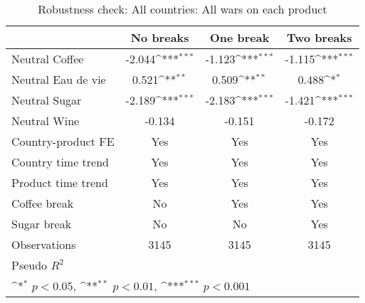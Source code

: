 \begin{table}[htbp]\centering
\def\sym#1{\ifmmode^{#1}\else\(^{#1}\)\fi}
\caption{Robustness check: All countries: All wars on each product\label{tab1}}
\begin{tabular}{l*{3}{c}}
\hline\hline
                    &\multicolumn{1}{c}{No breaks}&\multicolumn{1}{c}{One break}&\multicolumn{1}{c}{Two breaks}\\
\hline
Neutral Coffee      &      -2.044\sym{***}&      -1.123\sym{***}&      -1.115\sym{***}\\
Neutral Eau de vie  &       0.521\sym{**} &       0.509\sym{**} &       0.488\sym{*}  \\
Neutral Sugar       &      -2.189\sym{***}&      -2.183\sym{***}&      -1.421\sym{***}\\
Neutral Wine        &      -0.134         &      -0.151         &      -0.172         \\
Country-product FE  &         Yes         &         Yes         &         Yes         \\
Country time trend  &         Yes         &         Yes         &         Yes         \\
Product time trend  &         Yes         &         Yes         &         Yes         \\
Coffee break        &          No         &         Yes         &         Yes         \\
Sugar break         &          No         &          No         &         Yes         \\
\hline
Observations        &        3145         &        3145         &        3145         \\
Pseudo \(R^{2}\)    &                     &                     &                     \\
\hline\hline
\multicolumn{4}{l}{\footnotesize \sym{*} \(p<0.05\), \sym{**} \(p<0.01\), \sym{***} \(p<0.001\)}\\
\end{tabular}
\end{table}
